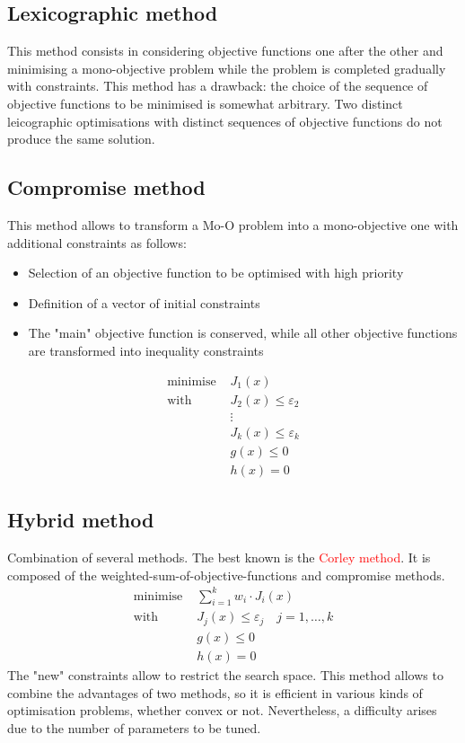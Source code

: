 \documentclass{book}
\begin{document}
\subsection{Lexicographic method}
This method consists in considering objective functions one after the other and minimising a mono-objective problem while the problem is completed gradually with constraints. This method has a drawback: the choice of the sequence of objective functions to be minimised is somewhat arbitrary. Two distinct leicographic optimisations with distinct sequences of objective functions do not produce the same solution.

\subsection{Compromise method}
This method allows to transform a Mo-O problem into a mono-objective one with additional constraints as follows:
\begin{itemize}
    \item Selection of an objective function to be optimised with high priority
    \item Definition of a vector of initial constraints 
    \item The "main" objective function is conserved, while all other objective functions are transformed into inequality constraints
\end{itemize}
\begin{align*}
    \text{minimise } & J_1(x)\\
    \text{with } & J_2(x) \leq \varepsilon_2\\
    & \vdots \\
    & J_k(x) \leq \varepsilon_k\\
    & g(x)\leq 0 \\ 
    & h(x) = 0 
\end{align*}

\subsection{Hybrid method}
Combination of several methods. The best known is the \textcolor{red}{Corley method}. It is composed of the weighted-sum-of-objective-functions and compromise methods. 
\begin{align*}
    \text{minimise } & \displaystyle\sum_{i=1}^{k}w_i \cdot J_i(x)\\
    \text{with } & J_j(x) \leq \varepsilon_j \quad j=1,\dots,k\\
    & g(x)\leq 0 \\ 
    & h(x) = 0 
\end{align*}
The "new" constraints allow to restrict the search space. This method allows to combine the advantages of two methods, so it is efficient in various kinds of optimisation problems, whether convex or not. Nevertheless, a difficulty arises due to the number of parameters to be tuned.
\end{document}

